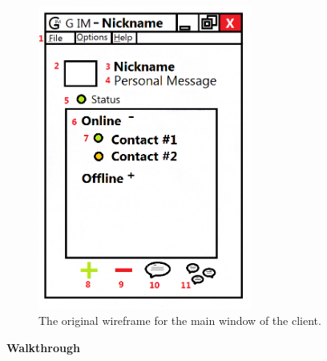 \begin{figure}[!h]
    \begin{center}
        \includegraphics[width=7cm]{Design/diagrams/Main_UI.png}
        \caption{The original wireframe for the main window of the client.}
        \label{mainui}
    \end{center}
\end{figure}

{\bf Walkthrough}

